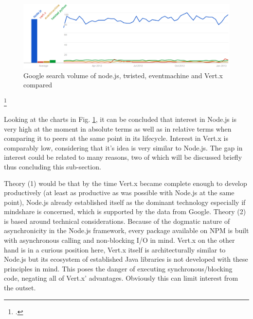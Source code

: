 \begin{figure}[hbtp]
\centering
\includegraphics[width=\textwidth]{img/googletrend_all.png}
\caption[Google search volume of node.js, twisted, eventmachine and Vert.x compared]{Google search volume of node.js, twisted, eventmachine and Vert.x compared\footnotemark}
\label{img_googletrend_all}
\end{figure}
\footcitetext[Cf.][]{g_trends}

Looking at the charts in Fig. \ref{img_googletrend_all}, it can be
concluded that interest in Node.js is very high at the moment in absolute terms as well
as in relative terms when comparing it to peers at the same point in its lifecycle.
Interest in Vert.x is comparably low, considering that it's idea is very similar to Node.js.
The gap in interest could be related to many reasons, two of which will be discussed briefly thus concluding this sub-section.

Theory (1) would be that by the time Vert.x became complete enough to develop
productively (at least as productive as was possible with Node.js at the same
point), Node.js already established itself as the dominant technology especially if
mindshare is concerned, which is supported by the data from Google.
Theory (2) is based around technical considerations. Because of the dogmatic
nature of asynchronicity in the Node.js framework, every package available on
NPM is built with asynchronous calling
and non-blocking I/O in mind. Vert.x on the
other hand is in a curious position here, Vert.x itself is architecturally
similar to Node.js but its ecosystem of established Java libraries is not developed
with these principles in mind. This poses the danger of executing
synchronous/blocking code, negating all of Vert.x' advantages. Obviously this
can limit interest from the outset.

